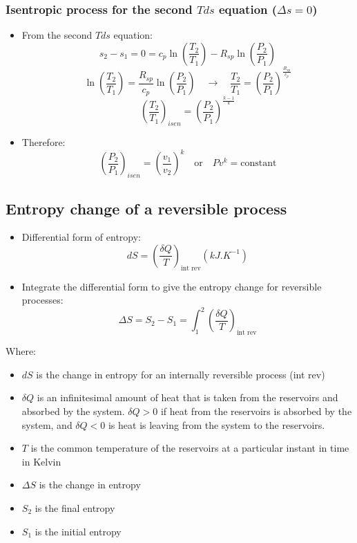 \documentclass[11pt]{article}
\begin{document}
\subsubsection{Isentropic process for the second \(Tds\) equation (\(\Delta s = 0\))}
\label{sec:org1555fd8}
\begin{itemize}
\item From the second \(Tds\) equation:
\[s_2 - s_1 = 0 = c_p \ln \left( \frac{T_2}{T_1} \right) - R_{sp} \ln \left( \frac{P_2}{P_1} \right)\]
\[\ln \left(\frac{T_2}{T_1} \right) = \frac{R_{sp}}{c_p} \ln \left( \frac{P_2}{P_1} \right) \quad \rightarrow \quad \frac{T_2}{T_1} = \left(\frac{P_2}{P_1} \right)^{\frac{R_{sp}}{c_p}}\]
\[\left( \frac{T_2}{T_1} \right)_{isen} = \left(\frac{P_2}{P_1} \right)^{\frac{k - 1}{k}}\]

\item Therefore:
\[\left(\frac{P_2}{P_1} \right)_{isen} = \left(\frac{v_1}{v_2} \right)^k \quad \text{or} \quad Pv^k = \text{constant}\]
\end{itemize}

 \newpage
\subsection{Entropy change of a reversible process}
\label{sec:org5218911}
\begin{itemize}
\item Differential form of entropy:
\[dS = \left( \frac{\delta Q}{T} \right)_{\text{int rev}} \left(\unit{kJ.K^{-1}} \right)\]
\item Integrate the differential form to give the entropy change for reversible processes:
\[\Delta S = S_2 - S_1 = \int_1^2 \left(\frac{\delta Q}{T} \right)_{\text{int rev}}\]
\end{itemize}

Where:
\begin{itemize}
\item \(dS\) is the change in entropy for an internally reversible process (int rev)
\item \(\delta Q\) is an infinitesimal amount of heat that is taken from the reservoirs and absorbed by the system. \(\delta Q > 0\) if heat from the reservoirs is absorbed by the system, and \(\delta Q < 0\) is heat is leaving from the system to the reservoirs.
\item \(T\) is the common temperature of the reservoirs at a particular instant in time in Kelvin
\item \(\Delta S\) is the change in entropy
\item \(S_2\) is the final entropy
\item \(S_1\) is the initial entropy
\end{itemize}
\end{document}
